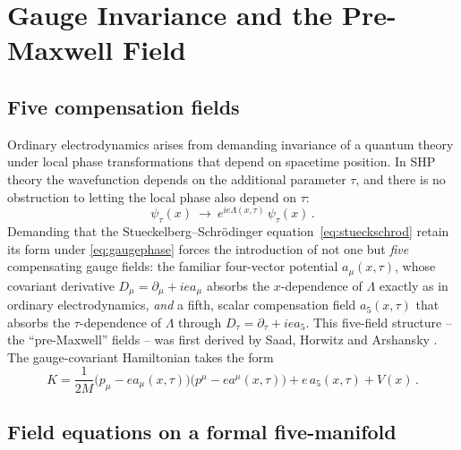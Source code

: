 \documentclass[11pt]{article}
\begin{document}
\section{Gauge Invariance and the Pre-Maxwell Field}
\label{sec:gauge}

\subsection{Five compensation fields}

Ordinary electrodynamics arises from demanding invariance of a quantum theory
under local phase transformations that depend on spacetime position. In SHP
theory the wavefunction depends on the additional parameter $\tau$, and there
is no obstruction to letting the local phase also depend on $\tau$:
\begin{equation}
\psi_\tau(x)\ \longrightarrow\ e^{ie\Lambda(x,\tau)}\,\psi_\tau(x)\,.
\label{eq:gaugephase}
\end{equation}
Demanding that the Stueckelberg--Schr\"odinger equation~\eqref{eq:stueckschrod}
retain its form under \eqref{eq:gaugephase} forces the introduction of not
one but \emph{five} compensating gauge fields: the familiar four-vector
potential $a_\mu(x,\tau)$, whose covariant derivative $D_\mu=\partial_\mu+iea_\mu$
absorbs the $x$-dependence of $\Lambda$ exactly as in ordinary electrodynamics,
\emph{and} a fifth, scalar compensation field $a_5(x,\tau)$ that absorbs the
$\tau$-dependence of $\Lambda$ through $D_\tau=\partial_\tau+iea_5$. This
five-field structure -- the ``pre-Maxwell'' fields -- was first derived by
Saad, Horwitz and Arshansky \cite{SaadHorwitzArshansky1989}. The gauge-covariant
Hamiltonian takes the form
\begin{equation}
K=\frac{1}{2M}\big(p_\mu-ea_\mu(x,\tau)\big)\big(p^\mu-ea^\mu(x,\tau)\big)+e\,a_5(x,\tau)+V(x)\,.
\label{eq:Kgaugecov}
\end{equation}

\subsection{Field equations on a formal five-manifold}
\end{document}
